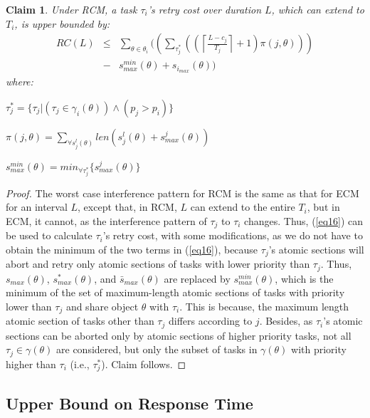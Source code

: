 \documentclass[letter]{sig-alternate}
\newtheorem{clm}{Claim}
\begin{document}
\begin{clm}
Under RCM, a task $\tau_i$'s retry cost over duration $L$, which can extend to $T_i$, is upper bounded by:
\begin{eqnarray}
RC\left(L\right) & \le & \sum_{\theta\in\theta_{i}}\Bigg(\left(\sum_{\tau_{j}^{*}}\left(\left(\left\lceil\frac{L-c_{j}}{T_{j}}\right\rceil+1\right)\pi\left(j,\theta\right)\right)\right)\nonumber \\
 & - & s_{max}^{min}\left(\theta\right)+s_{i_{max}}\left(\theta\right)\Bigg)\label{eq20}\end{eqnarray}
 where:
 \begin{compactitem}
\item $\tau_{j}^{*}=\{\tau_{j}|(\tau_{j}\in\gamma_i(\theta))\wedge(p_{j}> p_{i})\}$
\item $\pi(j,\theta)=\sum_{\forall s_{j}^{l}(\theta)}len\left(s_{j}^{l}\left(\theta\right)+s_{max}^{j}\left(\theta\right)\right)$
\item $s_{max}^{min}(\theta)=min_{\forall \tau_j^*} \{s_{max}^j(\theta)\}$
\end{compactitem}
\end{clm}
\begin{proof}
The worst case interference pattern for RCM is the same as that for ECM for an interval $L$, except that, in RCM, $L$ can extend to the entire $T_i$, but in ECM, it cannot, as the interference pattern of $\tau_j$ to $\tau_i$ changes. 
Thus, (\ref{eq16}) can be used to calculate $\tau_i$'s retry cost, with some modifications, as we do not have to obtain the minimum of the two terms in (\ref{eq16}), because $\tau_j$'s atomic sections will abort and retry only atomic sections of tasks with lower priority than $\tau_j$. Thus, $s_{max}(\theta)$, $s_{max}^*(\theta)$, and $\bar{s}_{max}(\theta)$ are replaced by $s_{max}^{min}(\theta)$, which is the minimum of the set of maximum-length atomic sections of tasks with priority lower than $\tau_j$ and share object $\theta$ with $\tau_i$. This is because, the maximum length atomic section of tasks other than $\tau_j$ differs according to $j$. Besides, as $\tau_i$'s atomic sections can be aborted only by atomic sections of higher priority tasks, not all $\tau_j \in \gamma (\theta)$ are considered, but only the subset of tasks in $\gamma (\theta)$ with priority higher than $\tau_i$ (i.e., $\tau_j^*$). 
Claim follows.
\end{proof}



\subsection{Upper Bound on Response Time}
\end{document}
